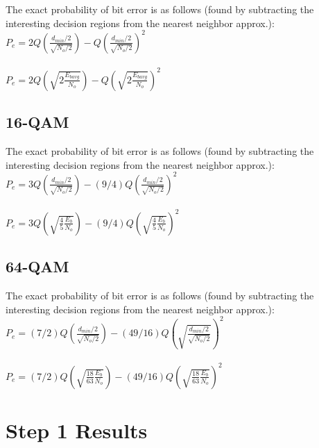 \documentclass[]{article}
\begin{document}
The exact probability of bit error is as follows (found by subtracting the interesting decision regions from the nearest neighbor approx.):\\

$ P_e = 2Q\left(\frac{d_{min}/2}{\sqrt{N_o/2}}\right)-Q\left(\frac{d_{min}/2}{\sqrt{N_o/2}}\right)^2$ \\ \\

$ P_e = 2Q\left(\sqrt{2\frac{E_{bavg}}{N_o}}\right)-Q\left(\sqrt{2\frac{E_{bavg}}{N_o}}\right)^2$ \\

\subsection{16-QAM}
\label{sec:qam16}

The exact probability of bit error is as follows (found by subtracting the interesting decision regions from the nearest neighbor approx.):\\

$ P_e = 3Q\left(\frac{d_{min}/2}{\sqrt{N_o/2}}\right)-(9/4)Q\left(\frac{d_{min}/2}{\sqrt{N_o/2}}\right)^2$ \\ \\

$ P_e = 3Q\left(\sqrt{\frac{4}{5}\frac{E_b}{N_o}}\right)-(9/4)Q\left(\sqrt{\frac{4}{5}\frac{E_{b}}{N_o}}\right)^2$  \\

\subsection{64-QAM}
\label{sec:qam64}
The exact probability of bit error is as follows (found by subtracting the interesting decision regions from the nearest neighbor approx.):\\

$P_e = (7/2)Q\left(\frac{d_{min}/2}{\sqrt{N_o/2}}\right) -(49/16)Q\left(\sqrt{\frac{d_{min}/2}{\sqrt{N_o/2}}}\right)^2$ \\ \\

$P_e = (7/2)Q\left(\sqrt{\frac{18}{63}\frac{E_b}{N_o}}\right)-(49/16)Q\left(\sqrt{\frac{18}{63}\frac{E_b}{N_o}}\right)^2$ \\



\section{Step 1 Results}
\end{document}
